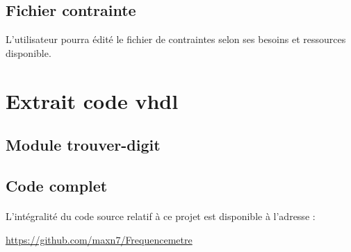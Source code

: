 \documentclass[a4paper,11pt]{article}
\begin{document}
\subsection{Fichier contrainte}
L'utilisateur pourra édité le fichier de contraintes selon ses besoins et ressources disponible.

\newpage
\section{Extrait code vhdl}
\subsection{Module trouver-digit}


\subsection{Code complet}

\paragraph{} L'intégralité du code source relatif à ce projet est disponible à l'adresse :
 \begin{center} 
  \url{https://github.com/maxn7/Frequencemetre}
 \end{center}
\end{document}
